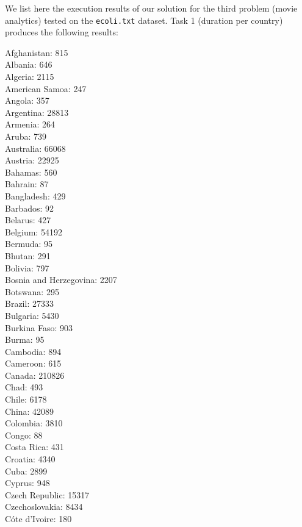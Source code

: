 We list here the execution results of our solution for the third problem (movie analytics) tested on the \texttt{ecoli.txt} dataset. Task 1 (duration per country) produces the following results:

\begin{multicols}{4}
  \noindent
  Afghanistan:	815
  \\ Albania:	646
  \\ Algeria:	2115
  \\ American Samoa:	247
  \\ Angola:	357
  \\ Argentina:	28813
  \\ Armenia:	264
  \\ Aruba:	739
  \\ Australia:	66068
  \\ Austria:	22925
  \\ Bahamas:	560
  \\ Bahrain:	87
  \\ Bangladesh:	429
  \\ Barbados:	92
  \\ Belarus:	427
  \\ Belgium:	54192
  \\ Bermuda:	95
  \\ Bhutan:	291
  \\ Bolivia:	797
  \\ Bosnia and Herzegovina:	2207
  \\ Botswana:	295
  \\ Brazil:	27333
  \\ Bulgaria:	5430
  \\ Burkina Faso:	903
  \\ Burma:	95
  \\ Cambodia:	894
  \\ Cameroon:	615
  \\ Canada:	210826
  \\ Chad:	493
  \\ Chile:	6178
  \\ China:	42089
  \\ Colombia:	3810
  \\ Congo:	88
  \\ Costa Rica:	431
  \\ Croatia:	4340
  \\ Cuba:	2899
  \\ Cyprus:	948
  \\ Czech Republic:	15317
  \\ Czechoslovakia:	8434
  \\ C\'ote d'Ivoire:	180

\end{multicols}
